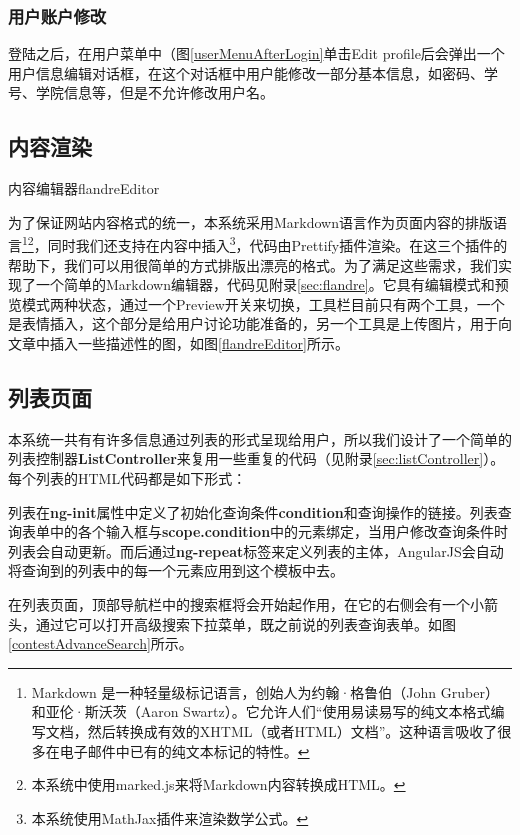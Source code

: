 \subsubsection{用户账户修改}
登陆之后，在用户菜单中（图\ref{userMenuAfterLogin}单击Edit profile后会弹出一个用户信息编辑对话框，在这个对话框中用户能修改一部分基本信息，如密码、学号、学院信息等，但是不允许修改用户名。

\subsection{内容渲染}
\begin{pics}[htbp]{内容编辑器}{flandreEditor}
\end{pics}
为了保证网站内容格式的统一，本系统采用Markdown语言作为页面内容的排版语言\footnote{Markdown 是一种轻量级标记语言，创始人为约翰·格鲁伯（John Gruber）和亚伦·斯沃茨（Aaron Swartz）。它允许人们``使用易读易写的纯文本格式编写文档，然后转换成有效的XHTML（或者HTML）文档''。这种语言吸收了很多在电子邮件中已有的纯文本标记的特性。}\footnote{本系统中使用marked.js来将Markdown内容转换成HTML。}，同时我们还支持在内容中插入\footnote{本系统使用MathJax插件来渲染数学公式。}，代码由Prettify插件渲染。在这三个插件的帮助下，我们可以用很简单的方式排版出漂亮的格式。为了满足这些需求，我们实现了一个简单的Markdown编辑器，代码见附录\ref{sec:flandre}。它具有编辑模式和预览模式两种状态，通过一个Preview开关来切换，工具栏目前只有两个工具，一个是表情插入，这个部分是给用户讨论功能准备的，另一个工具是上传图片，用于向文章中插入一些描述性的图，如图\ref{flandreEditor}所示。

\subsection{列表页面}
本系统一共有有许多信息通过列表的形式呈现给用户，所以我们设计了一个简单的列表控制器\textbf{ListController}来复用一些重复的代码（见附录\ref{sec:listController}）。每个列表的HTML代码都是如下形式：



列表在\textbf{ng-init}属性中定义了初始化查询条件\textbf{condition}和查询操作的链接。列表查询表单中的各个输入框与\textbf{scope.condition}中的元素绑定，当用户修改查询条件时列表会自动更新。而后通过\textbf{ng-repeat}标签来定义列表的主体，AngularJS会自动将查询到的列表中的每一个元素应用到这个模板中去。

在列表页面，顶部导航栏中的搜索框将会开始起作用，在它的右侧会有一个小箭头，通过它可以打开高级搜索下拉菜单，既之前说的列表查询表单。如图\ref{contestAdvanceSearch}所示。

